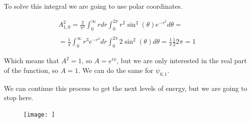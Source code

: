 To solve this integral we are going to use polar coordinates.

\begin{equation}
  \begin{array}{c}
    A^2_{1,0} = \frac{2}{\pi^2} \int_{0}^{\infty} rdr \int_{0}^{2\pi} r^2 \sin^2(\theta) e^{-r^2} d\theta =
    \\

    \\
    = \frac{1}{\pi} \int_{0}^{\infty} r^3 e^{-r^2} dr \int_{0}^{2\pi} 2\sin^2(\theta) d\theta = \frac{1}{\pi} \frac{1}{2} 2\pi = 1
  \end{array}
\end{equation}

Which means that $A^2 = 1$, so $A = e^{i\phi}$, but we are only interested in the real part of the function, so $A = 1$. We can do the same for $\psi_{0,1}$.


We can continue this process to get the next levels of energy, but we are going to stop here.

\begin{figure}
  \texttt{[image: ]}
\end{figure}






